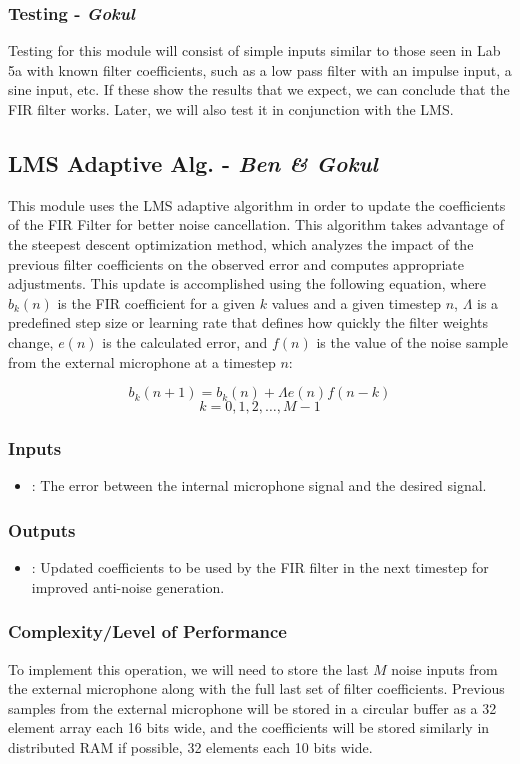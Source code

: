\documentclass{fpgairpods}
\begin{document}
\begin{multicols*}{2}
\subsubsection{Testing - \textit{Gokul}}
Testing for this module will consist of simple inputs similar to those seen in Lab 5a with known filter coefficients, such as a low pass filter with an impulse input, a sine input, etc. If these show the results that we expect, we can conclude that the FIR filter works. Later, we will also test it in conjunction with the LMS.

\subsection{LMS Adaptive Alg. - \textit{Ben \& Gokul}}
This module uses the LMS adaptive algorithm in order to update the coefficients of the FIR Filter for better noise cancellation. This algorithm takes advantage of the steepest descent optimization method, which analyzes the impact of the previous filter coefficients on the observed error and computes appropriate adjustments. This update is accomplished using the following equation, where $b_k(n)$ is the FIR coefficient for a given $k$ values and a given timestep $n$, $\Lambda$ is a predefined step size or learning rate that defines how quickly the filter weights change, $e(n)$ is the calculated error, and $f(n)$ is the value of the noise sample from the external microphone at a timestep $n$:

\[ b_k(n + 1) = b_k(n) + \Lambda e(n)f(n-k) \]
\[ k = 0, 1, 2,\ldots,  M-1 \]

\subsubsection{Inputs}
\begin{itemize}
    \item {}: The error between the internal microphone signal and the desired signal.
\end{itemize}
\subsubsection{Outputs}
\begin{itemize}
    \item {}: Updated coefficients to be used by the FIR filter in the next timestep for improved anti-noise generation.
\end{itemize}
\subsubsection{Complexity/Level of Performance}
To implement this operation, we will need to store the last $M$ noise inputs from the external microphone along with the full last set of filter coefficients. Previous samples from the external microphone will be stored in a circular buffer as a 32 element array each 16 bits wide, and the coefficients will be stored similarly in distributed RAM if possible, 32 elements each 10 bits wide.


\end{multicols*}
\end{document}
